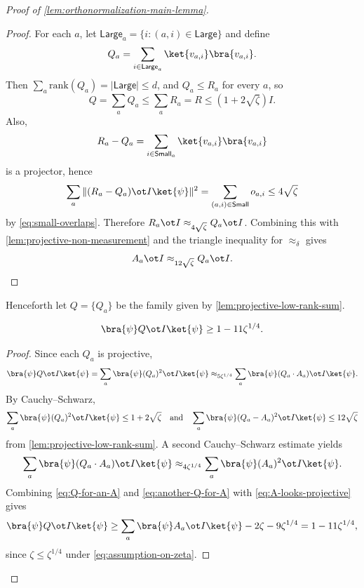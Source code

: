 \begin{proof}[Proof of \ref{lem:orthonormalization-main-lemma}]
\begin{proof}
		For each $a$, let $\mathsf{Large}_a=\{i : (a,i)\in \mathsf{Large}\}$ and define
		\[
			Q_a = \sum_{i \in \mathsf{Large}_a} \ket{v_{a,i}}\bra{v_{a,i}}.
		\]
		Then $\sum_a \mathrm{rank}(Q_a)=|\mathsf{Large}| \leq d$, and $Q_a \leq R_a$ for every $a$, so
		\[
			Q = \sum_a Q_a \leq \sum_a R_a = R \leq (1+2\sqrt{\zeta})I.
		\]
		Also,
		\[
			R_a-Q_a = \sum_{i \in \mathsf{Small}_a} \ket{v_{a,i}}\bra{v_{a,i}}
		\]
		is a projector, hence
		\[
			\sum_a \Vert (R_a-Q_a)\ot I \ket{\psi}\Vert^2
			=
			\sum_{(a,i)\in\mathsf{Small}} o_{a,i}
			\leq
			4\sqrt{\zeta}
		\]
		by \ref{eq:small-overlaps}. Therefore $R_a \ot I \approx_{4\sqrt{\zeta}} Q_a \ot I$. Combining this with \ref{lem:projective-non-measurement} and the triangle inequality for $\approx_\delta$ gives
		\[
			A_a \ot I \approx_{12\sqrt{\zeta}} Q_a \ot I.
		\]
	\end{proof}

	Henceforth let $Q=\{Q_a\}$ be the family given by \ref{lem:projective-low-rank-sum}.

	\begin{lemma}[Completeness of~$Q$]\label{lem:Q-completeness}
		\leanok
		\begin{equation*}
			\bra{\psi} Q \ot I \ket{\psi}
			\geq
			1 - 11 \zeta^{1/4}.
		\end{equation*}
	\end{lemma}
	\begin{proof}
		\leanok
		Since each $Q_a$ is projective,
		\begin{equation}\label{eq:Q-for-an-A}
			\bra{\psi} Q \ot I \ket{\psi}
			=
			\sum_a \bra{\psi} (Q_a)^2 \ot I \ket{\psi}
			\approx_{5\zeta^{1/4}}
			\sum_a \bra{\psi} (Q_a \cdot A_a)\ot I \ket{\psi}.
		\end{equation}
		By Cauchy--Schwarz,
		\[
			\sum_a \bra{\psi} (Q_a)^2 \ot I \ket{\psi} \leq 1+2\sqrt{\zeta}
			\quad\text{and}\quad
			\sum_a \bra{\psi} (Q_a-A_a)^2 \ot I \ket{\psi} \leq 12\sqrt{\zeta}
		\]
		from \ref{lem:projective-low-rank-sum}.
		A second Cauchy--Schwarz estimate yields
		\begin{equation}\label{eq:another-Q-for-A}
			\sum_a \bra{\psi} (Q_a \cdot A_a)\ot I \ket{\psi}
			\approx_{4\zeta^{1/4}}
			\sum_a \bra{\psi} (A_a)^2 \ot I \ket{\psi}.
		\end{equation}
		Combining \ref{eq:Q-for-an-A} and \ref{eq:another-Q-for-A} with \ref{eq:A-looks-projective} gives
		\[
			\bra{\psi} Q \ot I \ket{\psi}
			\geq
			\sum_a \bra{\psi} A_a \ot I \ket{\psi} - 2\zeta - 9\zeta^{1/4}
			=
			1 - 11\zeta^{1/4},
		\]
		since $\zeta \leq \zeta^{1/4}$ under \ref{eq:assumption-on-zeta}.
	\end{proof}


\end{proof}
